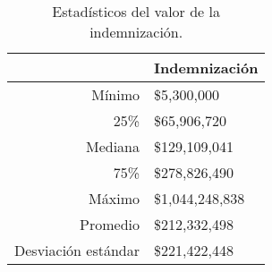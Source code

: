 \begin{table}[H]
\centering
\caption{Estadísticos del valor de la indemnización.} 
\label{tab:indemnizacion}
\begin{tabular}{rl}
  \hline
 & Indemnización \\ 
  \hline
Mínimo & \$5,300,000 \\ 
  25\% & \$65,906,720 \\ 
  Mediana & \$129,109,041 \\ 
  75\% & \$278,826,490 \\ 
  Máximo & \$1,044,248,838 \\ 
  Promedio & \$212,332,498 \\ 
  Desviación estándar & \$221,422,448 \\ 
   \hline
\end{tabular}
\end{table}
